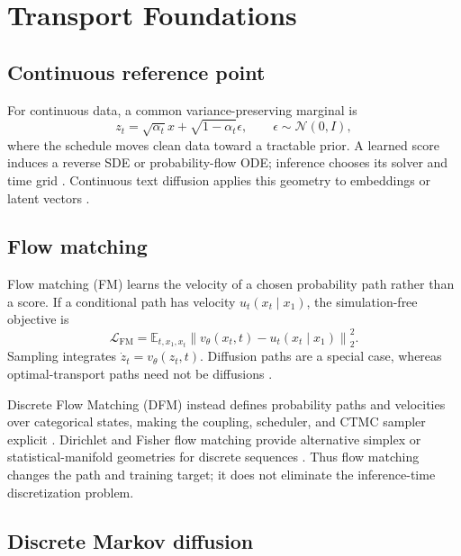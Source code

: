 \documentclass{article}
\begin{document}
\section{Transport Foundations}

\subsection{Continuous reference point}

For continuous data, a common variance-preserving marginal is
\begin{equation}
z_t=\sqrt{\alpha_t}x+\sqrt{1-\alpha_t}\epsilon,
\qquad \epsilon\sim\mathcal{N}(0,I),
\label{eq:continuous}
\end{equation}
where the schedule moves clean data toward a tractable prior.  A learned score
induces a reverse SDE or probability-flow ODE; inference chooses its solver
and time grid \citep{ho2020ddpm,lu2022dpmsolver}.  Continuous text diffusion
applies this geometry to embeddings or latent vectors \citep{li2022diffusionlm}.

\subsection{Flow matching}

Flow matching (FM) learns the velocity of a chosen probability path rather
than a score.  If a conditional path has velocity $u_t(x_t\mid x_1)$, the
simulation-free objective is
\begin{equation}
\mathcal{L}_{\mathrm{FM}}
=\mathbb{E}_{t,x_1,x_t}
\left\|v_\theta(x_t,t)-u_t(x_t\mid x_1)\right\|_2^2.
\label{eq:flow-matching}
\end{equation}
Sampling integrates \(\dot z_t=v_\theta(z_t,t)\).  Diffusion paths are a
special case, whereas optimal-transport paths need not be diffusions
\citep{lipman2023flow}.

Discrete Flow Matching (DFM) instead defines probability paths and velocities
over categorical states, making the coupling, scheduler, and CTMC sampler
explicit \citep{gat2024dfm,shaul2024generalpaths}.  Dirichlet and Fisher flow
matching provide alternative simplex or statistical-manifold geometries for
discrete sequences \citep{stark2024dirichlet,davis2024fisher}.  Thus flow
matching changes the path and training target; it does not eliminate the
inference-time discretization problem.

\subsection{Discrete Markov diffusion}
\end{document}
